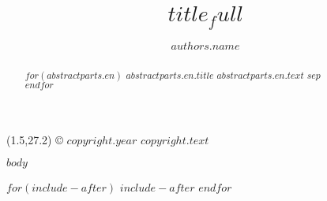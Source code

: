 \documentclass[twoside]{jchs}
\title{$title_full$}
\author[$authors.affiliation_ids$$if(authors.corresponding)$*$endif$]{$authors.name$} %
\affil[$affiliations.id$]{$affiliations.address$}
\begin{document}
\thispagestyle{empty}
\enlargethispage{-2\baselineskip}
\begin{abstract}
$for(abstractparts.en)$
{\bfseries $abstractparts.en.title$} $abstractparts.en.text$ $sep$\\
$endfor$\\
\end{abstract}
\maketitle\thispagestyle{empty} %



\begin{textblock}{18}(1.5,27.2)
\footnotesize{\noindent © $copyright.year$ $copyright.text$}
\end{textblock}







\begin{multicols}{2}
\raggedcolumns
$body$
\end{multicols}

$for(include-after)$
$include-after$
$endfor$



%
% 
\end{document}
